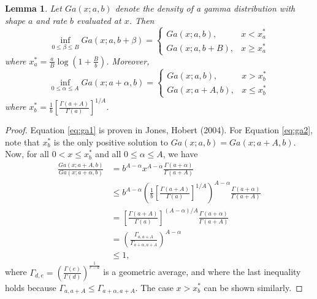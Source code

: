 \documentclass[11pt]{article}
\newtheorem{lemma}{Lemma}[section]
\begin{document}
	
	\begin{lemma}
		\label{pro:ga1}
		Let $Ga(x;a,b)$ denote the density of a gamma distribution with shape $a$ and rate $b$ evaluated at $x$. Then
		\begin{equation}
			\label{eq:ga1}
			\inf_{0\le \beta\le B} Ga(x;a,b+\beta) = 
			\begin{cases}
				Ga(x;a,b), & x<x_a^* \\ Ga(x;a,b+B), & x\ge x_a^*
			\end{cases}
		\end{equation}	
		where $x_a^*=\frac{a}{B}\log\left( 1+\frac{B}{b}\right) $. Moreover,
		\begin{equation}
			\label{eq:ga2}
			\inf_{0\le \alpha\le A} Ga(x;a+\alpha,b) = 
			\begin{cases}
				Ga(x;a,b), & x>x_b^* \\ Ga(x;a+A,b), & x\le x_b^*
			\end{cases}
		\end{equation}
		where $x_b^*=\frac{1}{b}\left[ \frac{\Gamma(a+A)}{\Gamma(a)}\right]^{1/A} $.
	\end{lemma}
	
	\begin{proof}
		Equation \ref{eq:ga1} is proven in Jones, Hobert (2004). For Equation \ref{eq:ga2}, note that $x_b^*$ is the only positive solution to $Ga(x;a,b) = Ga(x;a+A,b)$. Now, for all $0<x\le x_b^*$ and all $0\le\alpha\le A$, we have
		\begin{align*}
			\frac{Ga(x;a+A,b)}{Ga(x;a+\alpha,b)}
			& = b^{A-\alpha}x^{A-\alpha} \frac{\Gamma(a+\alpha)}{\Gamma(a+A)} \\
			& \le b^{A-\alpha}\left(\frac{1}{b}\left[ \frac{\Gamma(a+A)}{\Gamma(a)}\right]^{1/A} \right)^{A-\alpha} \frac{\Gamma(a+\alpha)}{\Gamma(a+A)} \\
			& = \left[ \frac{\Gamma(a+A)}{\Gamma(a)}\right]^{(A-\alpha)/A} \frac{\Gamma(a+\alpha)}{\Gamma(a+A)} \\
			& = \left( \frac{\Gamma_{a,a+A}}{\Gamma_{a+\alpha, a+A}}\right)^{A-\alpha} \\
			& \le 1,
		\end{align*}
		where $\Gamma_{d,e} = \left( \frac{\Gamma(e)}{\Gamma(d)} \right)^{\frac{1}{e-d}}$ is a geometric average,
		and where the last inequality holds because $\Gamma_{a,a+A}\le\Gamma_{a+\alpha, a+A}$.
		The case $x>x_b^*$ can be shown similarly.
	\end{proof}
\end{document}
